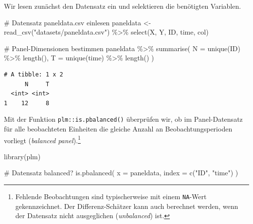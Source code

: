 \documentclass[
  a4paper,
  DIV=11,
  oneside]{scrreprt}
\newenvironment{Shaded}{\begin{snugshade}}{\end{snugshade}}
\newcommand{\AttributeTok}[1]{\textcolor[rgb]{0.40,0.45,0.13}{#1}}
\newcommand{\CommentTok}[1]{\textcolor[rgb]{0.37,0.37,0.37}{#1}}
\newcommand{\FunctionTok}[1]{\textcolor[rgb]{0.28,0.35,0.67}{#1}}
\newcommand{\NormalTok}[1]{\textcolor[rgb]{0.00,0.23,0.31}{#1}}
\newcommand{\OtherTok}[1]{\textcolor[rgb]{0.00,0.23,0.31}{#1}}
\newcommand{\SpecialCharTok}[1]{\textcolor[rgb]{0.37,0.37,0.37}{#1}}
\newcommand{\StringTok}[1]{\textcolor[rgb]{0.13,0.47,0.30}{#1}}
\begin{document}
Wir lesen zunächst den Datensatz ein und selektieren die benötigten
Variablen.

\begin{Shaded}
\begin{Highlighting}[]
\CommentTok{\# Datensatz \textquotesingle{}paneldata.csv\textquotesingle{} einlesen}
\NormalTok{paneldata }\OtherTok{\textless{}{-}} \FunctionTok{read\_csv}\NormalTok{(}\StringTok{"datasets/paneldata.csv"}\NormalTok{) }\SpecialCharTok{\%\textgreater{}\%} 
  \FunctionTok{select}\NormalTok{(X, Y, ID, time, col)}
\end{Highlighting}
\end{Shaded}

\begin{Shaded}
\begin{Highlighting}[]
\CommentTok{\# Panel{-}Dimensionen bestimmen}
\NormalTok{paneldata }\SpecialCharTok{\%\textgreater{}\%}
  \FunctionTok{summarise}\NormalTok{(}
    \AttributeTok{N =} \FunctionTok{unique}\NormalTok{(ID) }\SpecialCharTok{\%\textgreater{}\%} \FunctionTok{length}\NormalTok{(),}
    \AttributeTok{T =} \FunctionTok{unique}\NormalTok{(time) }\SpecialCharTok{\%\textgreater{}\%} \FunctionTok{length}\NormalTok{()}
\NormalTok{  )}
\end{Highlighting}
\end{Shaded}

\begin{verbatim}
# A tibble: 1 x 2
      N     T
  <int> <int>
1    12     8
\end{verbatim}

Mit der Funktion \texttt{plm::is.pbalanced()} überprüfen wir, ob im
Panel-Datensatz für alle beobachteten Einheiten die gleiche Anzahl an
Beobachtungsperioden vorliegt (\emph{balanced panel}).\footnote{Fehlende
  Beobachtungen sind typischerweise mit einem \texttt{NA}-Wert
  gekennzeichnet. Der Differenz-Schätzer kann auch berechnet werden,
  wenn der Datensatz nicht ausgeglichen (\emph{unbalanced}) ist.}

\begin{Shaded}
\begin{Highlighting}[]
\FunctionTok{library}\NormalTok{(plm)}

\CommentTok{\# Datensatz balanced?}
\FunctionTok{is.pbalanced}\NormalTok{(}
  \AttributeTok{x =}\NormalTok{ paneldata, }
  \AttributeTok{index =} \FunctionTok{c}\NormalTok{(}\StringTok{"ID"}\NormalTok{, }\StringTok{"time"}\NormalTok{)}
\NormalTok{)}
\end{Highlighting}
\end{Shaded}
\end{document}
